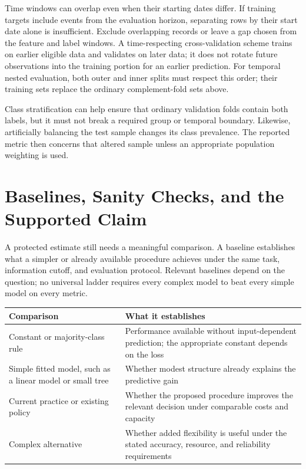 Time windows can overlap even when their starting dates differ. If training targets include events from the evaluation horizon, separating rows by their start date alone is insufficient. Exclude overlapping records or leave a gap chosen from the feature and label windows. A time-respecting cross-validation scheme trains on earlier eligible data and validates on later data; it does not rotate future observations into the training portion for an earlier prediction. For temporal nested evaluation, both outer and inner splits must respect this order; their training sets replace the ordinary complement-fold sets above.

Class stratification can help ensure that ordinary validation folds contain both labels, but it must not break a required group or temporal boundary. Likewise, artificially balancing the test sample changes its class prevalence. The reported metric then concerns that altered sample unless an appropriate population weighting is used.

\section{Baselines, Sanity Checks, and the Supported Claim}

A protected estimate still needs a meaningful comparison. A baseline establishes what a simpler or already available procedure achieves under the same task, information cutoff, and evaluation protocol. Relevant baselines depend on the question; no universal ladder requires every complex model to beat every simple model on every metric.

\par\addvspace{\intextsep}\noindent\begin{minipage}{\linewidth}
\centering\small
\begin{tabular}{@{}L{3.25cm}L{6.95cm}@{}}
\toprule
Comparison & What it establishes \\
\midrule
Constant or majority-class rule & Performance available without input-dependent prediction; the appropriate constant depends on the loss \\
Simple fitted model, such as a linear model or small tree & Whether modest structure already explains the predictive gain \\
Current practice or existing policy & Whether the proposed procedure improves the relevant decision under comparable costs and capacity \\
Complex alternative & Whether added flexibility is useful under the stated accuracy, resource, and reliability requirements \\
\bottomrule
\end{tabular}
\label{tab:baseline-ladder}
\end{minipage}\par\addvspace{\intextsep}


